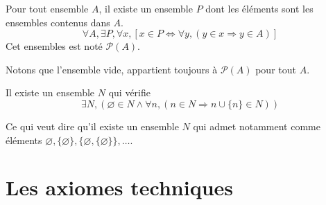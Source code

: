 \begin{axiome}\label{ens : axiome : parties}
	Pour tout ensemble $A$, il existe un ensemble $P$ dont les éléments sont les ensembles contenus dans $A$.
	\begin{equation*}
		\forall A,\exists P, \forall x, [x\in P\Leftrightarrow \forall y, (y\in x \Rightarrow y\in A)]
	\end{equation*}
	Cet ensembles est noté $\mathscr{P}(A)$.
\end{axiome}
\begin{remarque}
	Notons que l'ensemble vide, appartient toujours à $\mathscr{P}(A)$ pour tout $A$.
\end{remarque}
\begin{axiome}[de l'infini]
	Il existe un ensemble $N$ qui vérifie
	\begin{equation*}
		\exists N, (\varnothing \in N\land \forall n,(n\in N\Rightarrow  n\cup \{n\}\in N))
	\end{equation*}
\end{axiome}
Ce qui veut dire qu'il existe un ensemble $N$ qui admet notamment comme éléments
$\varnothing,\{\varnothing\},\{\varnothing,\{\varnothing\}\},\dotsc$.

\section*{Les axiomes techniques}

